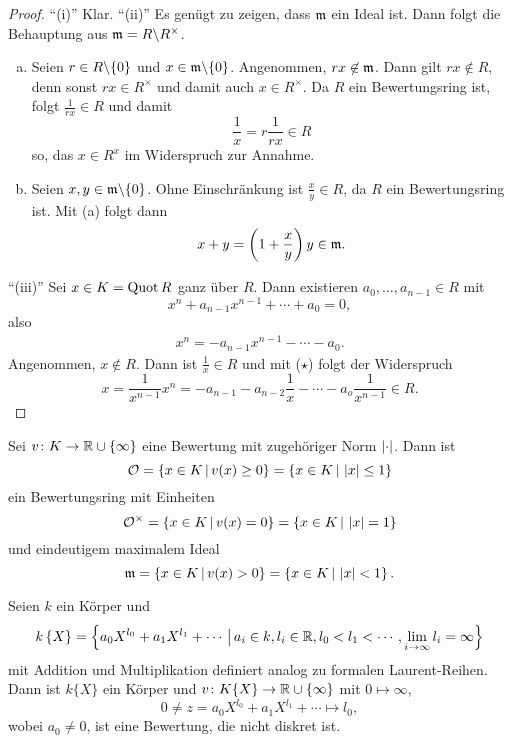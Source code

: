 


\begin{proof}
\enquote{(i)} Klar.
\enquote{(ii)} Es genügt zu zeigen, dass $\mathfrak{m}$ ein Ideal ist. Dann folgt die Behauptung aus $\mathfrak{m} = R \backslash R^\times$.
\begin{enumerate}[(a)]
\item Seien $r\in R \backslash \{0\}$ und $x\in \mathfrak{m} \backslash \{0\}$. Angenommen, $rx \not \in\mathfrak{m} $. Dann gilt $rx \not\in R$, denn sonst $rx \in R^\times$ und damit auch $x \in R^\times$.
Da $R$ ein Bewertungsring ist, folgt $\frac{1}{rx} \in R$ und damit
\[ \frac{1}{x} = r \frac{1}{rx} \in R
\]
so, das $x \in R^x$ im Widerspruch zur Annahme.
\item Seien $x,y\in \mathfrak{m} \backslash\{0\}$. Ohne Einschränkung ist $\frac{x}{y} \in R$, da $R$ ein Bewertungsring ist. Mit (a) folgt dann
\[ x+y= \left( 1 + \frac{x}{y} \right) y \in\mathfrak{m}.
\]
\end{enumerate}
\enquote{(iii)} Sei $x \in K= \operatorname{Quot} R$ ganz über $R$. Dann existieren $a_0 , \dots, a_{n-1} \in R$
mit
\[ x^n + a_{n-1}x^{n-1} + \cdots + a_0 =0,
\]
also
\begin{align}
x^n =- a_{n-1}x^{n-1} - \cdots - a_0 \tag{$\star$}.
\end{align}
Angenommen, $x \not\in R$. Dann ist $\frac{1}{x} \in R$ und mit ($\star$) folgt der Widerspruch
\[ x = \frac{1}{x^{n-1}} x^n
= -a_{n-1} - a_{n-2} \frac{1}{x} - \cdots - a_o\frac{1}{x^{n-1}} \in R.
\]
\end{proof}

\begin{Kor}
Sei $v\colon K\to \mathbb{R} \cup \{\infty \}$ eine Bewertung mit zugehöriger Norm $\left|{\cdot}\right|$. Dann ist
\[ \mathcal{O} = \left\{ x \in K \,|\, v(x) \geq 0 \right\}
=\left\{ x \in K \,|\, \left|{x}\right| \leq 1 \right\}
\]
ein Bewertungsring mit Einheiten
\[ \mathcal{O}^\times = \left\{ x \in K \,|\, v(x) = 0 \right\}
=\left\{ x \in K \,|\, \left|{x}\right| = 1 \right\}
\]
und eindeutigem maximalem Ideal
\[ \mathfrak{m} = \left\{ x \in K \,|\, v(x) > 0 \right\}
=\left\{ x \in K \,|\, \left|{x}\right| < 1 \right\}.
\]
\end{Kor}

\begin{Bsp}
Seien $k$ ein Körper und
\[ k \left\{X\right\} =
\left\{
a_0X^{l_0} + a_1 X^{l_1} + \cdots \,\big|\, a_i \in k, l_i \in \mathbb{R}, l_0 < l_1 < \cdots, \lim_{i \to \infty} l_i = \infty
\right\}
\]
mit Addition und Multiplikation definiert analog zu formalen Laurent-Reihen.
Dann ist $k\{X\}$ ein Körper und $v\colon K\{X\} \to \mathbb{R} \cup \{\infty\}$ mit $0 \mapsto \infty$,
\[ 0 \neq z = a_0X^{l_0} + a_1X^{l_1} + \cdots \mapsto l_0,
\]
wobei $a_0 \neq 0$, ist eine Bewertung, die nicht diskret ist.
\end{Bsp}



